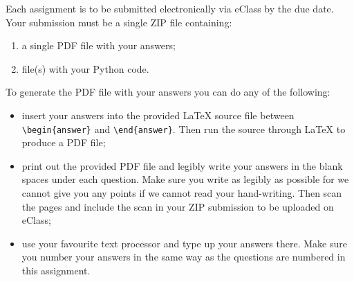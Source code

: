 \documentclass[10pt]{article}
\newcommand{\nin}{\noindent}
\newcommand{\ben}{\begin{enumerate}}
\newcommand{\een}{\end{enumerate}}
\newcommand{\ie}{\item}
\newcommand{\bei}{\begin{itemize}}
\newcommand{\eei}{\end{itemize}}
\newcommand{\tcm}[1]{\textcolor{m7}{#1}}
\begin{document}
\medskip

\nin Each assignment is to be submitted electronically via eClass by the due date.  \tcm{Your submission must be a single ZIP file containing}: 
\ben
\ie a single PDF file with your answers;
\ie file(s) with your Python code.
\een

\nin To generate the PDF file with your answers you can do any of the following:
\bei

\ie insert your answers into the provided \LaTeX{} source file between \verb|\begin{answer}| and \verb|\end{answer}|. Then run the source through \LaTeX{} to produce a PDF file;

\ie print out the provided PDF file and legibly write your answers in the blank spaces under each question. Make sure you write as legibly as possible for we cannot give you any points if we cannot read your hand-writing. Then scan the pages and include the scan in your ZIP submission to be uploaded on eClass;

\ie use your favourite text processor and type up your answers there. Make sure you number your answers in the same way as the questions are numbered in this assignment.

\eei

\end{document}
